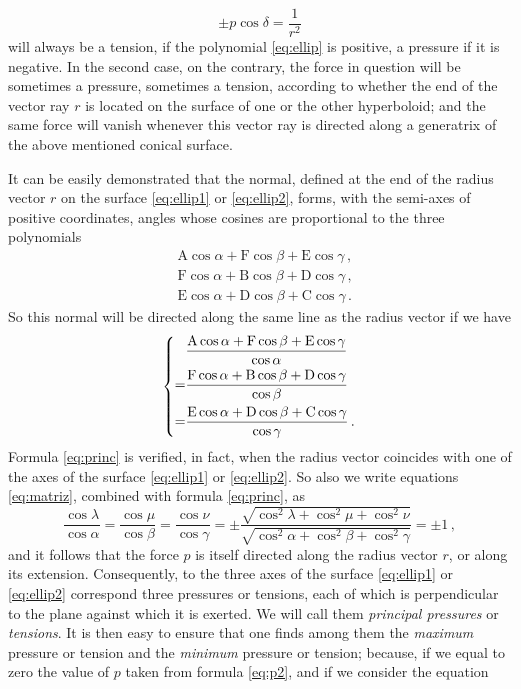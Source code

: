 \documentclass[leqno,openright,smallroyalvopaper,8pt,twoside,showtrims]{memoir}
\begin{document}
\begin{equation}
 \pm p\cos\delta = \dfrac{1}{r^2}
 \end{equation}
 will always be a tension, if the polynomial \eqref{eq:ellip} is positive, a pressure if it is negative. In the second case, on the contrary, the force in question will be sometimes a pressure, sometimes a tension, according to whether the end of the vector ray $r$ is located on the surface of one or the other hyperboloid; and the same force will vanish whenever this vector ray is directed along a generatrix of the above mentioned conical surface.

It can be easily demonstrated that the normal, defined at the end of the radius vector $r$ on the surface \eqref{eq:ellip1} or \eqref{eq:ellip2}, forms, with the semi-axes of positive coordinates, angles whose cosines are proportional to the three polynomials
\begin{align*}
&\text{A}\cos\alpha+\text{F}\cos\beta+\text{E}\cos\gamma\,,\\
&\text{F}\cos\alpha+\text{B}\cos\beta+\text{D}\cos\gamma\,,\\ 
&\text{E}\cos\alpha+\text{D}\cos\beta+\text{C}\cos\gamma\,.
\end{align*}
So this normal will be directed along the same line as the radius vector if we have
\begin{equation}\label{eq:princ}
\begin{dcases}
\begin{aligned}
&\dfrac{\text{A}\cos\alpha+\text{F}\cos\beta+\text{E}\cos\gamma}{\cos\alpha}\\
=&\dfrac{\text{F}\cos\alpha+\text{B}\cos\beta+\text{D}\cos\gamma}{\cos\beta}\\
=&\dfrac{\text{E}\cos\alpha+\text{D}\cos\beta+\text{C}\cos\gamma}{\cos\gamma}\,.
\end{aligned}
\end{dcases}
\end{equation}
Formula \eqref{eq:princ} is verified, in fact, when the radius vector coincides with one of the axes of the surface \eqref{eq:ellip1} or \eqref{eq:ellip2}. So also we write equations \eqref{eq:matriz}, combined with formula \eqref{eq:princ}, as
\begin{equation}
\dfrac{\cos\lambda}{\cos\alpha}=\dfrac{\cos\mu}{\cos\beta}=\dfrac{\cos\nu}{\cos\gamma}=\pm\dfrac{\sqrt{\cos^2\lambda+\cos^2\mu+\cos^2\nu}}{\sqrt{\cos^2\alpha+\cos^2\beta+\cos^2\gamma}}=\pm 1\,,
\end{equation}
and it follows that the force $p$ is itself directed along the radius vector $r$, or along its extension. Consequently, to the three axes of the surface \eqref{eq:ellip1} or \eqref{eq:ellip2} correspond three pressures or tensions, each of which is perpendicular to the plane against which it is exerted. We will call them \emph{principal pressures} or \emph{tensions}. It is then easy to ensure that one finds among them the \emph{maximum} pressure or tension and the \emph{minimum} pressure or tension; because, if we equal to zero the value of $p$ taken from formula \eqref{eq:p2}, and if we consider the equation
\end{document}
